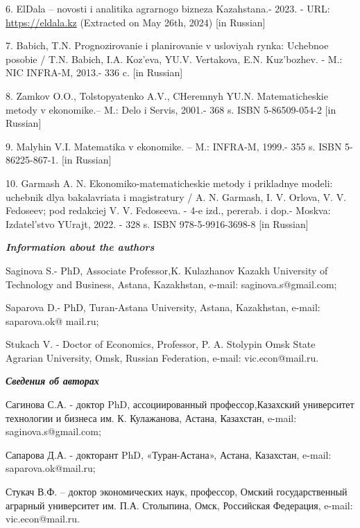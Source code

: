 6. ElDala -- novosti i analitika agrarnogo bizneza Kazahstana.- 2023. -
URL:
\href{https://eldala.kz/novosti/kazahstan/15357-v-kazahstane-vyroslo-kolichestvo-selhozkooperativov}{https://eldala.kz}
(Extracted on May 26th, 2024) {[}in Russian{]}

7. Babich, T.N. Prognozirovanie i planirovanie v usloviyah rynka:
Uchebnoe posobie / T.N. Babich, I.A. Koz'eva, YU.V. Vertakova, E.N.
Kuz'bozhev. - M.: NIC INFRA-M, 2013.- 336 c. {[}in Russian{]}

8. Zamkov O.O., Tolstopyatenko A.V., CHeremnyh YU.N. Matematicheskie
metody v ekonomike.-- M.: Delo i Servis, 2001.- 368 s. ISBN
5-86509-054-2 {[}in Russian{]}

9. Malyhin V.I. Matematika v ekonomike. -- M.: INFRA-M, 1999.- 355 s.
ISBN 5-86225-867-1. {[}in Russian{]}

10. Garmash A. N. Ekonomiko-matematicheskie metody i prikladnye modeli:
uchebnik dlya bakalavriata i magistratury / A. N. Garmash, I. V. Orlova,
V. V. Fedoseev; pod redakciej V. V. Fedoseeva. - 4-e izd., pererab. i
dop.- Moskva: Izdatel'stvo YUrajt, 2022. - 328 s.
ISBN 978-5-9916-3698-8 {[}in Russian{]}

\emph{{\bfseries Information about the authors}}

Saginova S.- PhD, Associate Professor,K. Kulazhanov Kazakh University of
Technology and Business, Astana, Kazakhstan, e-mail:
saginova.s@gmail.com;

Saparova D.- PhD, Turan-Astana University, Astana, Kazakhstan, e-mail:
saparova.ok@ mail.ru;

Stukach V. - Doctor of Economics, Professor, P. A. Stolypin Omsk State
Agrarian University, Omsk, Russian Federation, e-mail: vic.econ@mail.ru.

\emph{{\bfseries Сведения об авторах}}

Сагинова С.А. - доктор PhD, ассоциированный профессор,Казахский
университет технологии и бизнеса им. К. Кулажанова, Астана, Казахстан,
e-mail: saginova.s@gmail.com;

Сапарова Д.А. - докторант PhD, «Туран-Астана», Астана, Казахстан,
e-mail: saparova.ok@mail.ru;

Стукач В.Ф. -- доктор экономических наук, профессор, Омский
государственный аграрный университет им. П.А. Столыпина, Омск,
Российская Федерация, e-mail: vic.econ@mail.ru.
